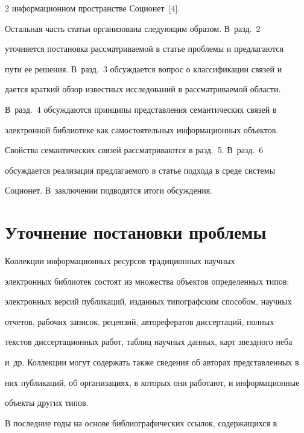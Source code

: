 \begin{multicols}{2}
информационном пространстве Соционет~[4].


  


  Остальная часть статьи организована сле\-ду\-ющим образом. В~разд.~2 


уточняется постановка рассматриваемой в статье проблемы и предлагаются 


пути ее решения. В~разд.~3 обсуждается вопрос о классификации связей и 


дается краткий обзор известных исследований в рассматриваемой области. 


В~разд.~4 обсуждаются принципы представления семантических связей в 


электронной библиотеке как самостоятельных информационных объектов. 


Свойства семантических связей рассматриваются в разд.~5. В~разд.~6 


обсуждается реализация предлагаемого в статье подхода в среде системы 


Соционет. В~заключении подводятся итоги обсуждения. 





\section{Уточнение постановки проблемы}





     Коллекции информационных ресурсов традиционных научных 


электронных библиотек состоят из множества объектов определенных типов: 


электронных версий публикаций, изданных типографским способом, научных 


отчетов, рабочих записок, рецензий, авторефератов диссертаций, полных 


текстов диссертационных работ, таблиц научных данных, карт звездного неба 


и~др. Коллекции могут содержать также сведения об авторах представленных в 


них публикаций, об организациях, в которых они работают, и информационные 


объекты других типов.


     


     В последние годы на основе библиографических ссылок, содержащихся в 



\end{multicols}
